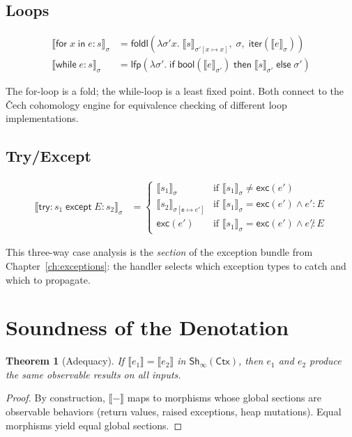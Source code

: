 \documentclass[11pt,a4paper]{report}
\theoremstyle{definition}
\theoremstyle{plain}
\newtheorem{theorem}[definition]{Theorem}
\newcommand{\den}[1]{\llbracket #1 \rrbracket}
\newcommand{\Ctx}{\mathsf{Ctx}}
\newcommand{\Sh}{\mathsf{Sh}}
\begin{document}
\subsection{Loops}

\begin{align}
  \den{\mathsf{for}\;x\;\mathsf{in}\;e:s}_\sigma
    &= \mathsf{foldl}\!\left(\lambda \sigma' x.\; \den{s}_{\sigma'[x \mapsto x]},\;
       \sigma,\; \mathsf{iter}(\den{e}_\sigma)\right) \\
  \den{\mathsf{while}\;e:s}_\sigma
    &= \mathsf{lfp}\!\left(\lambda \sigma'.\;
       \mathsf{if}\;\mathsf{bool}(\den{e}_{\sigma'})\;
       \mathsf{then}\;\den{s}_{\sigma'}\;\mathsf{else}\;\sigma'\right)
\end{align}

The for-loop is a fold; the while-loop is a least fixed point.  Both connect
to the \v{C}ech cohomology engine for equivalence checking of different loop
implementations.

\subsection{Try/Except}

\begin{align}
  \den{\mathsf{try}:s_1\;\mathsf{except}\;E:s_2}_\sigma
    &= \begin{cases}
      \den{s_1}_\sigma & \text{if } \den{s_1}_\sigma \neq \mathsf{exc}(e') \\
      \den{s_2}_{\sigma[\mathsf{e} \mapsto e']}
        & \text{if } \den{s_1}_\sigma = \mathsf{exc}(e') \wedge e' : E \\
      \mathsf{exc}(e') & \text{if } \den{s_1}_\sigma = \mathsf{exc}(e') \wedge e' \not: E
    \end{cases}
\end{align}

This three-way case analysis is the \emph{section} of the exception bundle
from Chapter~\ref{ch:exceptions}: the handler selects which exception types
to catch and which to propagate.

\section{Soundness of the Denotation}

\begin{theorem}[Adequacy]
\label{thm:adequacy}
If $\den{e_1} = \den{e_2}$ in $\Sh_\infty(\Ctx)$, then $e_1$ and $e_2$ produce
the same observable results on all inputs.
\end{theorem}
\begin{proof}
By construction, $\den{-}$ maps to morphisms whose global sections are
observable behaviors (return values, raised exceptions, heap mutations).
Equal morphisms yield equal global sections.
\end{proof}
\end{document}
